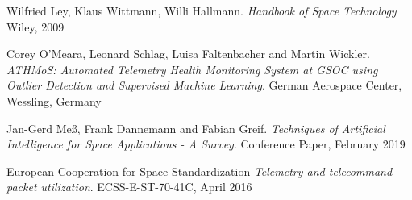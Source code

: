 
\begin{thebibliography}{9}
Wilfried Ley, Klaus Wittmann, Willi Hallmann.
\textit{Handbook of Space Technology}
Wiley, 2009

Corey O'Meara, Leonard Schlag, Luisa Faltenbacher and Martin Wickler.
\textit{ATHMoS: Automated Telemetry Health Monitoring System at GSOC using Outlier Detection and Supervised Machine Learning}. 
German Aerospace Center, Wessling, Germany

Jan-Gerd Meß, Frank Dannemann and Fabian Greif.
\textit{Techniques of Artificial Intelligence for Space Applications - A Survey}. 
Conference Paper, February 2019

European Cooperation for Space Standardization
\textit{Telemetry and telecommand packet utilization}. 
ECSS-E-ST-70-41C, April 2016

\end{thebibliography}